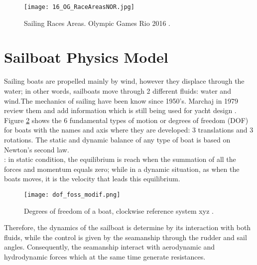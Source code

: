\begin{figure}[ht]
\centering
 \texttt{[image: 16\_OG\_RaceAreasNOR.jpg]}
  \caption{Sailing Races Areas. Olympic Games Rio 2016 \cite{instr_rio}.}
\label{fig:olymp_areas_rio} 
\end{figure}

\section {Sailboat Physics Model} \label{sailphysics}
Sailing boats are propelled mainly by wind, however they displace through the water; in other words, sailboats move through 2 different fluids: water and wind.The mechanics of sailing have been know since 1950's.  Marchaj in 1979 review them and add information which is still being used for yacht design \cite{marchajaereo1979}. Figure \ref{DOF} shows the 6 fundamental types of motion or degrees of freedom (DOF) for boats with the names and axis where they are developed: 3 translations and 3 rotations.  
The static and dynamic balance of any type of boat is based on Newton's second law. \\
:  in static condition, the equilibrium is reach when the summation of all the forces and momentum equals zero; while in a dynamic situation, as when the boats moves, it is the velocity that leads this equilibrium.
\begin{figure}[ht]
\centering
  \texttt{[image: dof\_foss\_modif.png]}
 \caption{Degrees of freedom of a boat, clockwise reference system xyz \cite{fossati2009aero}. }
\label{DOF}
\end{figure}
Therefore, the dynamics of the sailboat is determine by its interaction with both fluids, while the control is given by the seamanship through the rudder and sail angles. Consequently, the seamanship interact with aerodynamic and hydrodynamic forces which at the same time generate resistances.


